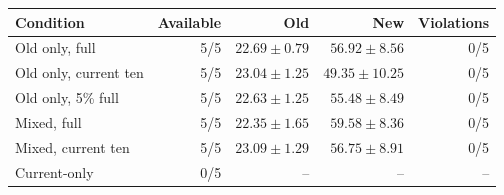 \begin{tabular}{lrrrr}
\toprule
Condition & Available & Old & New & Violations\\
\midrule
Old only, full & 5/5 & $22.69\pm0.79$ & $56.92\pm8.56$ & 0/5\\
Old only, current ten & 5/5 & $23.04\pm1.25$ & $49.35\pm10.25$ & 0/5\\
Old only, 5\% full & 5/5 & $22.63\pm1.25$ & $55.48\pm8.49$ & 0/5\\
Mixed, full & 5/5 & $22.35\pm1.65$ & $59.58\pm8.36$ & 0/5\\
Mixed, current ten & 5/5 & $23.09\pm1.29$ & $56.75\pm8.91$ & 0/5\\
Current-only & 0/5 & -- & -- & --\\
\bottomrule
\end{tabular}
